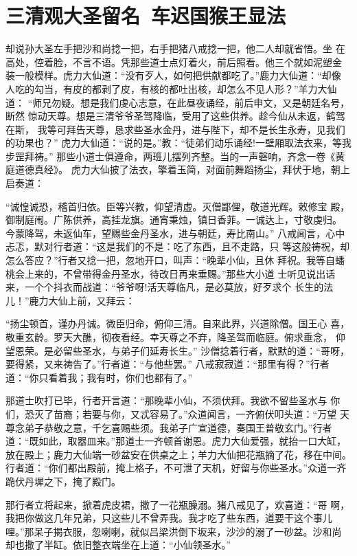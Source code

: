 \chapter{三清观大圣留名~车迟国猴王显法}

却说孙大圣左手把沙和尚捻一把，右手把猪八戒捻一把，他二人却就省悟。坐
在高处，倥着脸，不言不语。凭那些道士点灯着火，前后照看。他三个就如泥塑金
装一般模样。虎力大仙道：“没有歹人，如何把供献都吃了。”鹿力大仙道：“却像
人吃的勾当，有皮的都剥了皮，有核的都吐出核，却怎么不见人形？”羊力大仙道：
“师兄勿疑。想是我们虔心志意，在此昼夜诵经，前后申文，又是朝廷名号，断然
惊动天尊。想是三清爷爷圣驾降临，受用了这些供养。趁今仙从未返，鹤驾在斯，
我等可拜告天尊，恳求些圣水金丹，进与陛下，却不是长生永寿，见我们的功果也？”
虎力大仙道：“说的是。”教：“徒弟们动乐诵经!一壁厢取法衣来，等我步罡拜祷。”
那些小道士俱遵命，两班儿摆列齐整。当的一声磬响，齐念一卷《黄庭道德真经》。
虎力大仙披了法衣，擎着玉简，对面前舞蹈扬尘，拜伏于地，朝上启奏道：

“诚惶诚恐，稽首归依。臣等兴教，仰望清虚。灭僧鄙俚，敬道光辉。敕修宝
殿，御制庭闱。广陈供养，高挂龙旗。通宵秉烛，镇日香菲。一诚达上，寸敬虔归。
今蒙降驾，未返仙车，望赐些金丹圣水，进与朝廷，寿比南山。”
八戒闻言，心中忐忑，默对行者道：“这是我们的不是：吃了东西，且不走路，只
等这般祷祝，却怎么答应？”行者又捻一把，忽地开口，叫声：“晚辈小仙，且休
拜祝。我等自蟠桃会上来的，不曾带得金丹圣水，待改日再来垂赐。”那些大小道
士听见说出话来，一个个抖衣而战道：“爷爷呀!活天尊临凡，是必莫放，好歹求个
长生的法儿！”鹿力大仙上前，又拜云：

“扬尘顿首，谨办丹诚。微臣归命，俯仰三清。自来此界，兴道除僧。国王心
喜，敬重玄龄。罗天大醮，彻夜看经。幸天尊之不弃，降圣驾而临庭。俯求垂念，
仰望恩荣。是必留些圣水，与弟子们延寿长生。”
沙僧捻着行者，默默的道：“哥呀，要得紧，又来祷告了。”行者道：“与他些罢。”
八戒寂寂道：“那里有得？”行者道：“你只看着我；我有时，你们也都有了。”

那道士吹打已毕，行者开言道：“那晚辈小仙，不须伏拜。我欲不留些圣水与
你们，恐灭了苗裔；若要与你，又忒容易了。”众道闻言，一齐俯伏叩头道：“万望
天尊念弟子恭敬之意，千乞喜赐些须。我弟子广宣道德，奏国王普敬玄门。”行者
道：“既如此，取器皿来。”那道士一齐顿首谢恩。虎力大仙爱强，就抬一口大缸，
放在殿上；鹿力大仙端一砂盆安在供桌之上；羊力大仙把花瓶摘了花，移在中间。
行者道：“你们都出殿前，掩上格子，不可泄了天机，好留与你些圣水。”众道一齐
跪伏丹墀之下，掩了殿门。

那行者立将起来，掀着虎皮裙，撒了一花瓶臊溺。猪八戒见了，欢喜道：“哥
啊，我把你做这几年兄弟，只这些儿不曾弄我。我才吃了些东西，道要干这个事儿
哩。”那呆子揭衣服，忽喇喇，就似吕梁洪倒下坂来，沙沙的溺了一砂盆。沙和尚
却也撒了半缸。依旧整衣端坐在上道：“小仙领圣水。”

